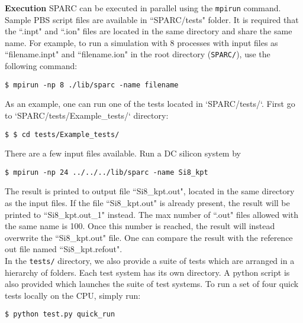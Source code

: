 \begin{frame}{\textbf{Execution}} \label{Execution}
SPARC can be executed in parallel using the \texttt{mpirun} command. Sample PBS script files are available in ``SPARC/tests" folder. It is required that the ``.inpt" and ``.ion" files are located in the same directory and share the same name. For example, to run a simulation with 8 processes with input files as ``filename.inpt" and ``filename.ion" in the root directory (\texttt{SPARC/}), use the following command:
\begin{verbatim}
$ mpirun -np 8 ./lib/sparc -name filename
\end{verbatim} 
As an example, one can run one of the tests located in `SPARC/tests/`. First go to `SPARC/tests/Example\_tests/` directory:
\begin{verbatim}
$ $ cd tests/Example_tests/
\end{verbatim} 
There are a few input files available. Run a DC silicon system by
\begin{verbatim}
$ mpirun -np 24 ../../../lib/sparc -name Si8_kpt
\end{verbatim} 

The result is printed to output file ``Si8\_kpt.out", located in the same directory as the input files. If the file ``Si8\_kpt.out" is already present, the result will be printed to ``Si8\_kpt.out\_1" instead. The max number of ``.out" files allowed with the same name is 100. Once this number is reached, the result will instead overwrite the ``Si8\_kpt.out" file. One can compare the result with the reference out file named ``Si8\_kpt.refout".\\%


\hspace{3mm} In the \texttt{tests/} directory, we also provide a suite of tests which are arranged in a hierarchy of folders. Each test system has its own directory. A python script is also provided which launches the suite of test systems. To run a set of four quick tests locally on the CPU, simply run: 
\begin{verbatim}
$ python test.py quick_run
\end{verbatim} 


\end{frame}

